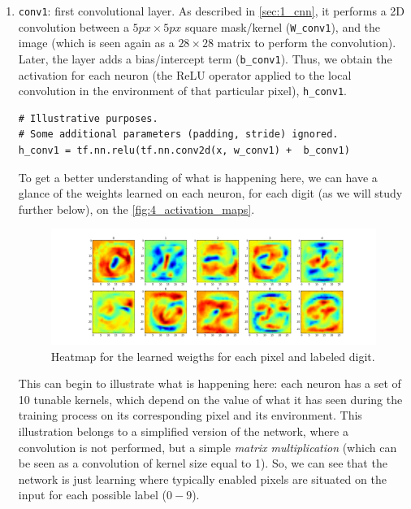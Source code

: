 		\begin{enumerate}
			\item \texttt{conv1}: first convolutional layer. As described in \autoref{sec:1_cnn}, it performs a 2D convolution between a $5px \times 5px$ square mask/kernel (\texttt{W\_conv1}), and the image (which is seen again as a $28 \times 28$ matrix to perform the convolution). Later, the layer adds a bias/intercept term (\texttt{b\_conv1}). Thus, we obtain the activation for each neuron (the ReLU operator applied to the local convolution in the environment of that particular pixel), \texttt{h\_conv1}.
			
			\begin{lstlisting}
# Illustrative purposes.
# Some additional parameters (padding, stride) ignored.
h_conv1 = tf.nn.relu(tf.nn.conv2d(x, w_conv1) +  b_conv1)
			\end{lstlisting}
			
			To get a better understanding of what is happening here, we can have a glance of the weights learned on each neuron, for each digit (as we will study further below), on the \autoref{fig:4_activation_maps}.
			
			\begin{figure}[h]
				\centering
				\includegraphics[width=6in]{images/digitclassifier_activation_maps}
				\caption{Heatmap for the learned weigths for each pixel and labeled digit.}
				\label{fig:4_activation_maps}
			\end{figure}
			
			This can begin to illustrate what is happening here: each neuron has a set of 10 tunable kernels, which depend on the value of what it has seen during the training process on its corresponding pixel and its environment. This illustration belongs to a simplified version of the network, where a convolution is not performed, but a simple \emph{matrix multiplication} (which can be seen as a convolution of kernel size equal to 1). So, we can see that the network is just learning where typically enabled pixels are situated on the input for each possible label ($0-9$).
			

\end{enumerate}
